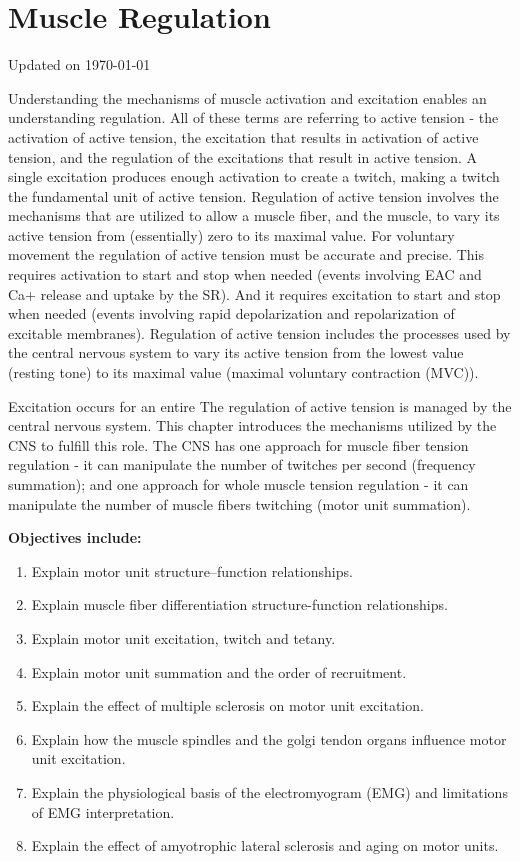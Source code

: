 \chapter{Muscle Regulation}\label{chp:regulation}
Updated on \today
\minitoc

Understanding the mechanisms of muscle activation and excitation enables an understanding regulation. All of these terms are referring to active tension - the activation of active tension, the excitation that results in activation of active tension, and the regulation of the excitations that result in active tension. A single excitation produces enough activation to create a twitch, making a twitch the fundamental unit of active tension. Regulation of active tension involves the mechanisms that are utilized to allow a muscle fiber, and the muscle, to vary its active tension from (essentially) zero to its maximal value. For voluntary movement the regulation of active tension must be accurate and precise. This requires activation to start and stop when needed (events involving EAC and Ca+ release and uptake by the SR). And it requires excitation to start and stop when needed (events involving rapid depolarization and repolarization of excitable membranes). Regulation of active tension includes the processes used by the central nervous system to vary its active tension from the lowest value (resting tone) to its maximal value (maximal voluntary contraction (MVC)). 




Excitation occurs for an entire The regulation of active tension is managed by the central nervous system. This chapter introduces the mechanisms utilized by the CNS to fulfill this role. The CNS has one approach for muscle fiber tension regulation - it can manipulate the number of twitches per second (frequency summation); and one approach for whole muscle tension regulation - it can manipulate the number of muscle fibers twitching (motor unit summation). 

\vspace{5mm}

\textbf{Objectives include:}
\begin{enumerate}
    \item Explain motor unit structure–function relationships.
    \item Explain muscle fiber differentiation structure-function relationships.
    \item Explain motor unit excitation, twitch and tetany.
    \item Explain motor unit summation and the order of recruitment.
    \item Explain the effect of multiple sclerosis on motor unit excitation.
    \item Explain how the muscle spindles and the golgi tendon organs influence motor unit excitation.
    \item Explain the physiological basis of the electromyogram (EMG) and limitations of EMG interpretation.
    \item Explain the effect of amyotrophic lateral sclerosis and aging on motor units.
\end{enumerate}\

